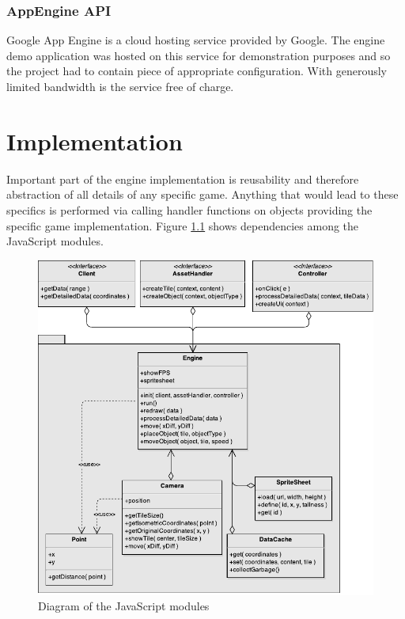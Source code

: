\documentclass[11pt,oneside, final]{fithesis2}
\begin{document}
\subsection{AppEngine API}
Google App Engine is a cloud hosting service provided by Google. The engine demo application was hosted on this service for demonstration purposes and so the project had to contain piece of appropriate configuration. With generously limited bandwidth is the service free of charge. \cite{appengine}

\chapter{Implementation}
\label{implementation}
Important part of the engine implementation is reusability and therefore abstraction of all details of any specific game. Anything that would lead to these specifics is performed via calling handler functions on objects providing the specific game implementation. Figure \ref{classdiagram} shows dependencies among the JavaScript modules.

\begin{figure}[htp]
	\centering
	\includegraphics[width=\textwidth]{thesis-classdiagram}
	\caption{Diagram of the JavaScript modules}
	\label{classdiagram}
\end{figure}
\end{document}
